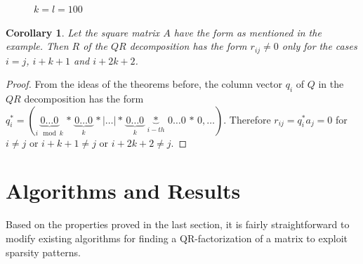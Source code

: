 \documentclass{article}
\numberwithin{pic}{section}
\numberwithin{lem}{section}
\numberwithin{thm}{section}
\newtheorem{cor}{Corollary}
\numberwithin{cor}{section}
\theoremstyle{definition}
\numberwithin{ex}{section}
\numberwithin{defn}{section}
\theoremstyle{definition}
\theoremstyle{remark}
\begin{document}
\begin{figure}[H] 

    \caption{$k=l=100$ }
\end{figure} 
\begin{cor}
Let the square matrix $A$ have the form as mentioned in the example. 
Then $R$ of the $QR$ decomposition has the form $r_{ij}\neq 0$ only for the cases $i=j$, $i+k+1$ and $i+2k+2$.
\end{cor}
\begin{proof}
From the ideas of the theorems before, the column vector $q_i$ of $Q$ in the $QR$ decomposition has the form $q_i^*=(\underbrace{0\dots0}_{i\mod k}\,*\,\underbrace{0\dots0}_{k }\,*|\dots|*\,\underbrace{0\dots0}_{k}\,\underbrace{*}_{i-th}\,0\dots0\,*\,0,\dots)$.
Therefore $r_{ij}= q_i^* a_j=0$ for $i\neq j$ or $i+k+1\neq j$ or $i+2k+2\neq j$.
\end{proof}
\section{Algorithms and Results}
Based on the properties proved in the last section, it is fairly straightforward
to modify existing algorithms for finding a QR-factorization of a matrix to
exploit sparsity patterns.
\end{document}
